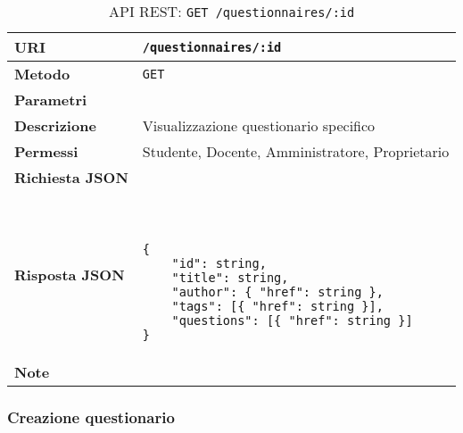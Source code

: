         \begin{table}[H]
            \begin{center}
                \begin{tabular}{p{} p{}}
                    \toprule
                    \textbf{URI} & \texttt{/questionnaires/:id} \\ \midrule
                    \textbf{Metodo} & \texttt{GET} \\ \midrule
                    \textbf{Parametri} & \\ \midrule
                    \textbf{Descrizione} & Visualizzazione questionario specifico \\ \midrule
                    \textbf{Permessi} & Studente, Docente, Amministratore, Proprietario  \\ \midrule
                    \textbf{Richiesta JSON} & \\ \midrule
                    \textbf{Risposta JSON} & \
                        \begin{lstlisting}[basicstyle={\ttfamily}]
{
    "id": string,
    "title": string,
    "author": { "href": string },
    "tags": [{ "href": string }],
    "questions": [{ "href": string }] 
}
                        \end{lstlisting}
                        \\ \midrule
                    \textbf{Note} & \\
                    \bottomrule
                \end{tabular}
                \caption{API REST: \texttt{GET /questionnaires/:id}}
            \end{center}
        \end{table}

    \subsubsection{Creazione questionario}

